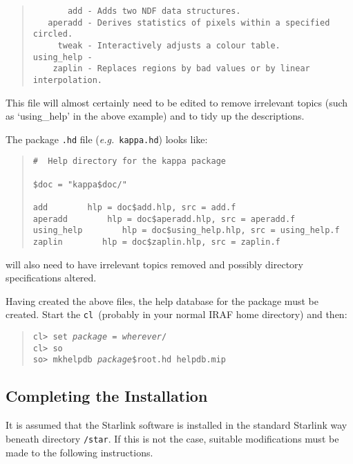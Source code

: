\documentclass[twoside,11pt]{article}
\newcommand{\xlabel}[1]{}
\newcommand{\cl}{\texttt{cl}}
\begin{document}
\begin{quote} \begin{verbatim}
       add - Adds two NDF data structures.
   aperadd - Derives statistics of pixels within a specified circled.
     tweak - Interactively adjusts a colour table.
using_help - 
    zaplin - Replaces regions by bad values or by linear interpolation.
\end{verbatim} \end{quote} 
This file will almost certainly need to be edited to remove irrelevant 
topics (such as `using\_help' in the above example) and to tidy up the 
descriptions.

The package \texttt{.hd} file (\textit{e.g.}\ \texttt{kappa.hd}) looks like:
\begin{quote} \begin{verbatim}
#  Help directory for the kappa package

$doc = "kappa$doc/"

add        hlp = doc$add.hlp, src = add.f
aperadd        hlp = doc$aperadd.hlp, src = aperadd.f
using_help        hlp = doc$using_help.hlp, src = using_help.f
zaplin        hlp = doc$zaplin.hlp, src = zaplin.f
\end{verbatim} \end{quote} 
will also need to have irrelevant topics removed and possibly directory
specifications altered.

Having created the above files, the help database for the package must be
created. Start the \cl\ (probably in your normal IRAF home directory) and then:

\begin{quote}
\texttt{cl> set \textit{package} = \textit{wherever}/\\
cl> so\\
so> mkhelpdb \textit{package}\$root.hd helpdb.mip}
\end{quote}

\subsection{\xlabel{completing_the_installation}Completing the Installation}

It is assumed that the Starlink software is installed in the standard Starlink
way beneath directory \texttt{/star}. If this is not the case, suitable
modifications must be made to the following instructions.
\end{document}

